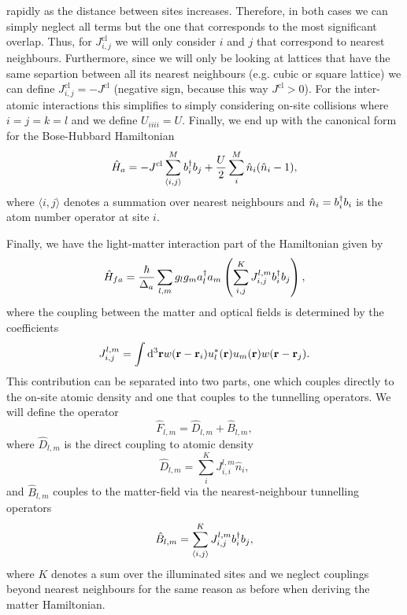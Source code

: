 rapidly as the distance between sites increases. Therefore, in both
cases we can simply neglect all terms but the one that corresponds to
the most significant overlap. Thus, for $J_{i,j}^\mathrm{cl}$ we will
only consider $i$ and $j$ that correspond to nearest neighbours.
Furthermore, since we will only be looking at lattices that have the
same separtion between all its nearest neighbours (e.g. cubic or
square lattice) we can define $J_{i,j}^\mathrm{cl} = - J^\mathrm{cl}$
(negative sign, because this way $J^\mathrm{cl} > 0$). For the
inter-atomic interactions this simplifies to simply considering
on-site collisions where $i=j=k=l$ and we define $U_{iiii} =
U$. Finally, we end up with the canonical form for the Bose-Hubbard
Hamiltonian
\begin{equation}
  \hat{H}_a = -J^\mathrm{cl} \sum_{\langle i,j \rangle}^M b^\dagger_i b_j + 
  \frac{U}{2} \sum_{i}^M \hat{n}_i (\hat{n}_i - 1),
\end{equation}
where $\langle i,j \rangle$ denotes a summation over nearest
neighbours and $\hat{n}_i = b^\dagger_i b_i$ is the atom number operator at
site $i$.

Finally, we have the light-matter interaction part of the Hamiltonian
given by
\begin{equation}
  \hat{H}_{fa} = \frac{\hbar}{\Delta_a} \sum_{l,m} g_l g_m a^\dagger_l a_m
  \left( \sum_{i,j}^K J^{l,m}_{i,j} b^\dagger_i b_j \right),
\end{equation}
where the coupling between the matter and optical fields is determined
by the coefficients
\begin{equation}
  J^{l,m}_{i,j} = \int \mathrm{d}^3 \mathbf{r} w(\mathbf{r} - \mathbf{r}_i)
  u_l^*(\mathbf{r}) u_m(\mathbf{r}) w(\mathbf{r} - \mathbf{r}_j).
\end{equation}
This contribution can be separated into two parts, one which couples
directly to the on-site atomic density and one that couples to the
tunnelling operators. We will define the operator
\begin{equation}
  \label{eq:F}
  \hat{F}_{l,m} = \hat{D}_{l,m} + \hat{B}_{l,m},
\end{equation}
where $\hat{D}_{l,m}$ is the direct coupling to atomic density
\begin{equation}
  \label{eq:D}
  \hat{D}_{l,m} = \sum_{i}^K J^{l,m}_{i,i} \hat{n}_i,
\end{equation}
and $\hat{B}_{l,m}$ couples to the matter-field via the
nearest-neighbour tunnelling operators
\begin{equation}
  \label{eq:B}
  \hat{B}_{l,m} = \sum_{\langle i, j \rangle}^K J^{l,m}_{i,j} b^\dagger_i b_j,
\end{equation}
where $K$ denotes a sum over the illuminated sites and we neglect
couplings beyond nearest neighbours for the same reason as before when
deriving the matter Hamiltonian.

